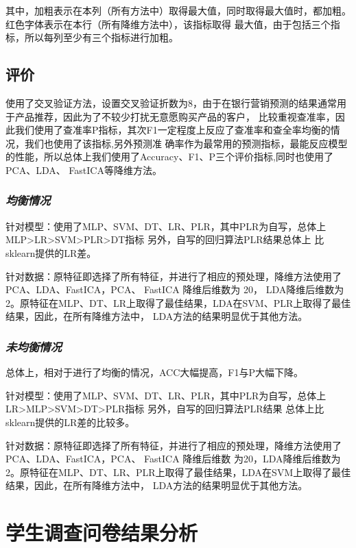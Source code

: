 \documentclass{acm_proc_article-sp}
\begin{document}
其中，加粗表示在本列（所有方法中）取得最大值，同时取得最大值时，都加粗。红色字体表示在本行（所有降维方法中），该指标取得
最大值，由于包括三个指标，所以每列至少有三个指标进行加粗。

\subsection{\textsf{评价}}

使用了交叉验证方法，设置交叉验证折数为8，由于在银行营销预测的结果通常用于产品推荐，因此为了不较少打扰无意愿购买产品的客户，
比较重视查准率，因此我们使用了查准率P指标，其次F1一定程度上反应了查准率和查全率均衡的情况，我们也使用了该指标,另外预测准
确率作为最常用的预测指标，最能反应模型的性能，所以总体上我们使用了Accuracy、F1、P三个评价指标,同时也使用了PCA、LDA、
FastICA等降维方法。

\subsubsection{\textsl{均衡情况}}

针对模型：使用了MLP、SVM、DT、LR、PLR，其中PLR为自写，总体上MLP>LR>SVM>PLR>DT指标 另外，自写的回归算法PLR结果总体上
比sklearn提供的LR差。

针对数据：原特征即选择了所有特征，并进行了相应的预处理，降维方法使用了PCA、LDA、FastICA，PCA、 FastICA 降维后维数为
20， LDA降维后维数为2。原特征在MLP、DT、LR上取得了最佳结果，LDA在SVM、PLR上取得了最佳结果，因此，在所有降维方法中，
LDA方法的结果明显优于其他方法。

\subsubsection{\textsl{未均衡情况}}

总体上，相对于进行了均衡的情况，ACC大幅提高，F1与P大幅下降。

针对模型：使用了MLP、SVM、DT、LR、PLR，其中PLR为自写，总体上LR>MLP>SVM>DT>PLR指标 另外，自写的回归算法PLR结果
总体上比sklearn提供的LR差的比较多。

针对数据：原特征即选择了所有特征，并进行了相应的预处理，降维方法使用了PCA、LDA、FastICA，PCA、 FastICA 降维后维数
为20，LDA降维后维数为2。原特征在MLP、DT、LR、PLR上取得了最佳结果，LDA在SVM上取得了最佳结果，因此，在所有降维方法中，
LDA方法的结果明显优于其他方法。

\section{\textsf{学生调查问卷结果分析}}
\end{document}
